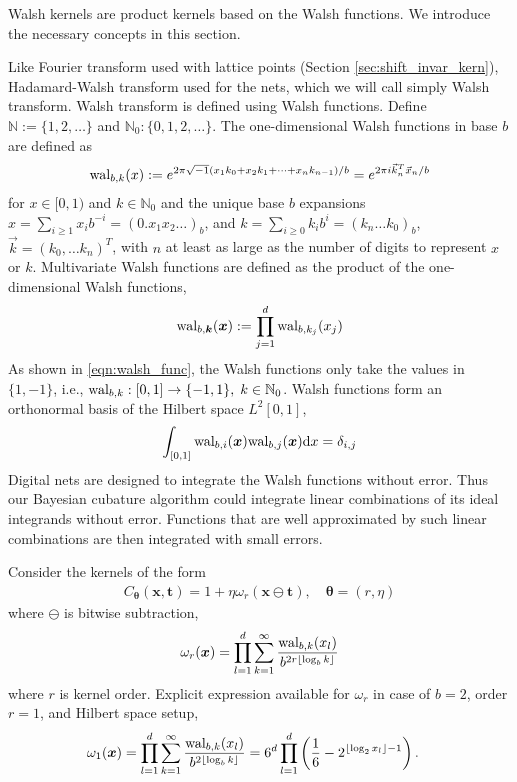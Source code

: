 \documentclass{iitthesis}          %
\newcommand{\bm}[1]{\boldsymbol{#1}}
\newcommand{\dif}[1]{\text{d}{#1}}
\newcommand{\naturals}{\mathbb{N}}
\newcommand{\vtheta}{{\bm{\theta}}}
\newcommand{\vk}{\bm{k}}
\newcommand{\vt}{\bm{t}}
\newcommand{\vx}{\bm{x}}
\newcommand{\dx}{\dif{{x}}}
\begin{document}

Walsh kernels are product kernels based on the Walsh functions. We introduce the necessary concepts in this section.

Like Fourier transform used with lattice points (Section \ref{sec:shift_invar_kern}), Hadamard-Walsh transform used for the nets, which we will call simply Walsh transform. Walsh transform  is defined using Walsh functions. Define $\naturals:=\lbrace1,2,\dots \rbrace$ and $\naturals_0 : \lbrace0,1,2,\dots \rbrace$.
The one-dimensional Walsh functions in base $b$ are defined as
\begin{align}
\label{eqn:walsh_func}
\textup{wal}_{b,k}(x) := e^{2\pi \sqrt{-1} (x_1 k_0 + x_2 k_1 + \dots + x_n k_{n-1})/b} 
=
e^{2\pi i {\vec{k}}_n^T{\vec{x}}_n/b}
\end{align}
for $x \in [0,1)$ and $k \in \naturals_0$ and the unique base $b$ expansions 
$x = \sum_{i \ge 1} x_i b^{-i} = (0.x_1 x_2 \dots)_b$,
and
$k = \sum_{i \ge 0} k_i b^{i} = (k_n \dots k_0)_b$, $\vec{k} =  (k_0,\dots k_n)^T$,
with $n$ at least as large as the number of digits to represent $x$ or $k$.
Multivariate Walsh functions are defined as the product of the one-dimensional Walsh functions,
\begin{align*}
\textup{wal}_{b,\vk} (\vx) := \prod_{j=1}^d \textup{wal}_{b,k_j} (x_j
)
\end{align*}
As shown in \eqref{eqn:walsh_func}, the Walsh functions only take the values in $\{1, -1\}$, i.e., $\textup{wal}_{b,k} : [0,1] \to {\{-1, 1\}} , \; k \in \naturals_0$. Walsh functions form an orthonormal basis of the Hilbert space $L^2[0,1]$,
\begin{align*}
\int_{[0,1]}
\textup{wal}_{b,i} (\vx) \textup{wal}_{b,j}(\vx) \dx = \delta_{i, j}
\end{align*}
Digital nets are designed to integrate the Walsh functions without error.
Thus our Bayesian cubature algorithm could integrate linear combinations of its ideal integrands without error. Functions that are well approximated by such linear combinations are then integrated with small errors.

Consider the kernels of the form \cite{Nuyens2013}
\begin{align}
\label{eqn:walsh_kernel}
C_{\vtheta}(\vx, \vt) = 1 + \eta \omega_{r} (\vx \ominus \vt), \quad \vtheta = (r, \eta)
\end{align}
where $\ominus$ is bitwise subtraction,
\begin{align*}
\omega_r(\vx) = \prod_{l=1}^d \sum_{k=1}^\infty 
\frac{\textup{wal}_{b,k}(x_l) }{b^{2r \lfloor \log_b k \rfloor}}
\end{align*}
where $r$ is kernel order. Explicit expression available for $\omega_{r}$ \cite{Nuyens2013} in case of $b=2$, order $r=1$, and Hilbert space setup,
\begin{align}
\label{eqn:omega1}
\omega_1(\vx) 
&= \prod_{l=1}^d \sum_{k=1}^\infty 
\frac{\textup{wal}_{b,k}(x_l) }{b^{2 \lfloor \log_b k \rfloor}} 
 = 6^d \prod_{l=1}^d \left( \frac 16 - 2^{\lfloor \log_2 x_l \rfloor -1 }\right).
\end{align}
\end{document}
